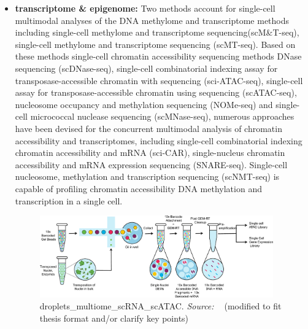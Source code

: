 \begin{itemize}
	\item \textbf{transcriptome \& epigenome:}
	Two methods account for single-cell multimodal analyses of the DNA methylome and transcriptome methods including single-cell methylome and transcriptome sequencing(scM\&T-seq)\citep{angermueller2016scmntseq}, single-cell methylome and transcriptome sequencing (scMT-seq)\citep{hu2016scmtseq}. Based on these methods single-cell chromatin accessibility sequencing methods DNase sequencing (scDNase-seq), single-cell combinatorial indexing assay for transposase-accessible chromatin with sequencing (sci-ATAC-seq)\citep{cusanovich2015multiplex}, single-cell assay for transposase-accessible chromatin using sequencing (scATAC-seq), nucleosome occupancy and methylation sequencing (NOMe-seq)\citep{kelly2012nomeseq} and single-cell micrococcal nuclease sequencing (scMNase-seq)\citep{lai2018scmnaseseq}, numerous approaches have been devised for the concurrent multimodal analysis of chromatin accessibility and transcriptomes, including single-cell combinatorial indexing chromatin accessibility and mRNA (sci-CAR)\citep{cao2018scicar}, single-nucleus chromatin accessibility and mRNA expression sequencing (SNARE-seq)\citep{chen2019SNARE}. Single-cell nucleosome, methylation and transcription sequencing (scNMT-seq)\citep{clark2018scnmt} is capable of profiling chromatin accessibility DNA methylation and transcription in a single cell.

	\begin{figure}[!ht]
		\centering
		\includegraphics[width=0.95\textwidth]{droplets_multiome_scRNA_scATAC/fig}
		\vspace{0.1cm}
		\caption[10X Droplets-based simultaneous sequencing of scRNA and scATAC.]{droplets\_multiome\_scRNA\_scATAC. \emph{Source: ~\cite{satpathy2019massively}} (modified to fit thesis format and/or clarify key points)}
		\label{fig:droplets_multiome_scRNA_scATAC}
	\end{figure}



\end{itemize}
